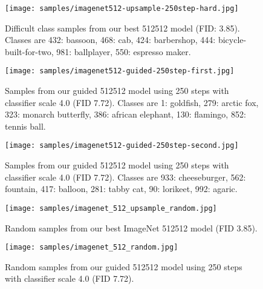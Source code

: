 \documentclass{article}
\begin{document}
\clearpage
\begin{figure}[h]
    \centerline{\texttt{[image: samples/imagenet512-upsample-250step-hard.jpg]}}
    \caption{Difficult class samples from our best 512512 model (FID: 3.85). Classes are 432: bassoon, 468: cab, 424: barbershop, 444: bicycle-built-for-two, 981: ballplayer, 550: espresso maker.}
    \vskip -1in
\end{figure}

\clearpage

\begin{figure}[h]
    \centerline{\texttt{[image: samples/imagenet512-guided-250step-first.jpg]}}
    \caption{Samples from our guided 512512 model using 250 steps with classifier scale 4.0 (FID 7.72). Classes are 1: goldfish, 279: arctic fox, 323: monarch butterfly, 386: african elephant, 130: flamingo, 852: tennis ball.}
\end{figure}
\clearpage
\begin{figure}[h]
    \centerline{\texttt{[image: samples/imagenet512-guided-250step-second.jpg]}}
    \caption{Samples from our guided 512512 model using 250 steps with classifier scale 4.0 (FID 7.72). Classes are 933: cheeseburger, 562: fountain, 417: balloon, 281: tabby cat, 90: lorikeet, 992: agaric.}
\end{figure}

\clearpage

\begin{figure}[tb]
    \centerline{\texttt{[image: samples/imagenet\_512\_upsample\_random.jpg]}}
    \caption{Random samples from our best ImageNet 512512 model (FID 3.85).}
    \vskip -1in
\end{figure}

\begin{figure}[tb]
    \centerline{\texttt{[image: samples/imagenet\_512\_random.jpg]}}
    \caption{Random samples from our guided 512512 model using 250 steps with classifier scale 4.0 (FID 7.72).}
    \vskip -1in
\end{figure}

\clearpage
\end{document}
